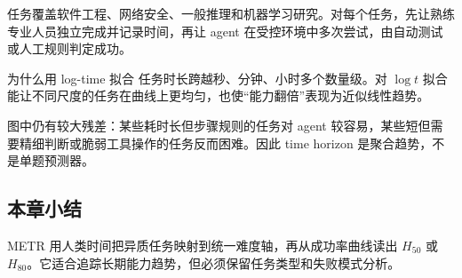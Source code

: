 任务覆盖软件工程、网络安全、一般推理和机器学习研究。对每个任务，先让熟练专业人员独立完成并记录时间，再让 agent 在受控环境中多次尝试，由自动测试或人工规则判定成功。

\begin{knowledgebox}{为什么用 log-time 拟合}
任务时长跨越秒、分钟、小时多个数量级。对 $\log t$ 拟合能让不同尺度的任务在曲线上更均匀，也使“能力翻倍”表现为近似线性趋势。
\end{knowledgebox}


图中仍有较大残差：某些耗时长但步骤规则的任务对 agent 较容易，某些短但需要精细判断或脆弱工具操作的任务反而困难。因此 time horizon 是聚合趋势，不是单题预测器。

\subsection{本章小结}

METR 用人类时间把异质任务映射到统一难度轴，再从成功率曲线读出 $H_{50}$ 或 $H_{80}$。它适合追踪长期能力趋势，但必须保留任务类型和失败模式分析。

